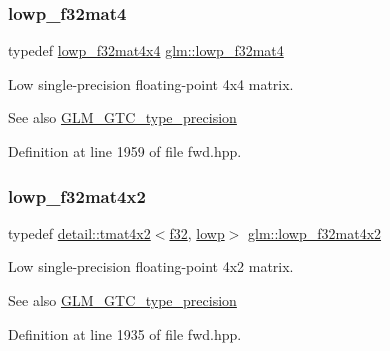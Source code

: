 \subsubsection{\texorpdfstring{lowp\+\_\+f32mat4}{lowp\_f32mat4}}
{\footnotesize\ttfamily typedef \hyperlink{group__gtc__type__precision_gab7a6454e1f5d5c434ff316b139eb0231}{lowp\+\_\+f32mat4x4} \hyperlink{group__gtc__type__precision_gada4d11f44b410c1be7b6b1d05ccf692c}{glm\+::lowp\+\_\+f32mat4}}

Low single-\/precision floating-\/point 4x4 matrix. \begin{DoxySeeAlso}{See also}
\hyperlink{group__gtc__type__precision}{G\+L\+M\+\_\+\+G\+T\+C\+\_\+type\+\_\+precision} 
\end{DoxySeeAlso}


Definition at line 1959 of file fwd.\+hpp.

\mbox{\label{group__gtc__type__precision_ga6eedee3981e5bf150ad7463786d0d694}} 
\subsubsection{\texorpdfstring{lowp\+\_\+f32mat4x2}{lowp\_f32mat4x2}}
{\footnotesize\ttfamily typedef \hyperlink{structglm_1_1detail_1_1tmat4x2}{detail\+::tmat4x2}$<$\hyperlink{group__gtc__type__precision_ga0ec999b57f5330d9021256e96038df04}{f32}, \hyperlink{namespaceglm_a0f04f086094c747d227af4425893f545ae161af3fc695e696ce3bf69f7332bc2d}{lowp}$>$ \hyperlink{group__gtc__type__precision_ga6eedee3981e5bf150ad7463786d0d694}{glm\+::lowp\+\_\+f32mat4x2}}

Low single-\/precision floating-\/point 4x2 matrix. \begin{DoxySeeAlso}{See also}
\hyperlink{group__gtc__type__precision}{G\+L\+M\+\_\+\+G\+T\+C\+\_\+type\+\_\+precision} 
\end{DoxySeeAlso}


Definition at line 1935 of file fwd.\+hpp.

\mbox{\label{group__gtc__type__precision_gadd0ff5b09c6ecac83e4e908e3f6478c7}} 
